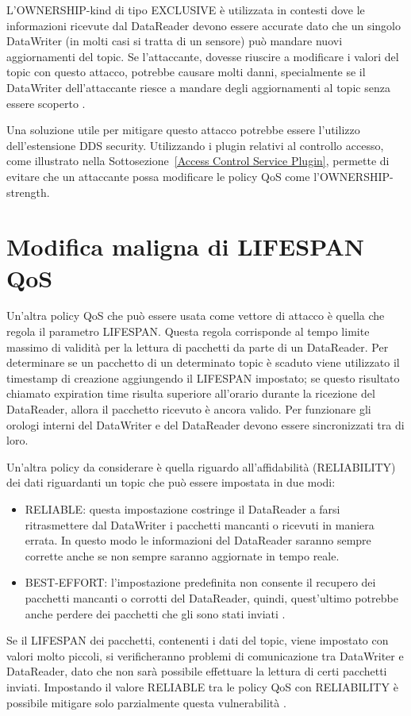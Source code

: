 L'OWNERSHIP-kind di tipo EXCLUSIVE è utilizzata in contesti dove le
informazioni ricevute dal DataReader devono essere accurate dato che un singolo
DataWriter (in molti casi si tratta di un sensore) può mandare nuovi aggiornamenti
del topic. Se l'attaccante, dovesse riuscire a modificare i valori del topic con
questo attacco, potrebbe causare molti danni,
specialmente se il DataWriter dell'attaccante riesce a mandare degli aggiornamenti
al topic senza essere scoperto
\cite{DBLP:conf/malware/MichaudDL18}.

Una soluzione utile per mitigare questo attacco potrebbe essere l'utilizzo
dell'estensione DDS security. Utilizzando i plugin relativi al controllo accesso,
come illustrato nella Sottosezione~\ref{Access Control Service Plugin}, permette
di evitare che un attaccante possa modificare le policy QoS come 
l'OWNERSHIP-strength.


\section{Modifica maligna di LIFESPAN QoS}

Un'altra policy QoS che può essere usata come vettore di attacco è quella
che regola il parametro LIFESPAN. Questa regola corrisponde al tempo limite massimo 
di validità per la
lettura di pacchetti da parte di un DataReader. Per determinare se un pacchetto
di un determinato topic è scaduto viene utilizzato il timestamp di creazione
aggiungendo il LIFESPAN impostato; se questo risultato chiamato 
expiration time risulta
superiore all'orario durante la ricezione del DataReader, allora il pacchetto
ricevuto è ancora valido. 
Per funzionare gli orologi interni del DataWriter e del DataReader
devono essere sincronizzati tra di loro.

Un'altra policy da considerare è quella riguardo all'affidabilità
(RELIABILITY) dei dati riguardanti un topic che può essere impostata in due
modi:
\begin{itemize}
    \item RELIABLE: questa impostazione costringe il DataReader a farsi
    ritrasmettere dal DataWriter i pacchetti mancanti o ricevuti in maniera errata.
    In questo modo le informazioni del DataReader saranno sempre corrette anche
    se non sempre saranno aggiornate in tempo reale.
    \item BEST-EFFORT: l'impostazione predefinita non consente il recupero
    dei pacchetti mancanti o corrotti
    del DataReader, quindi, quest'ultimo potrebbe anche perdere dei pacchetti 
    che gli sono stati inviati \cite{dds1.4}.
\end{itemize}
Se il LIFESPAN dei pacchetti, contenenti i dati del topic,
viene impostato con valori molto piccoli, si verificheranno problemi di comunicazione
tra DataWriter e DataReader, dato che non sarà possibile effettuare la lettura di 
certi pacchetti inviati. Impostando il valore RELIABLE tra le policy QoS con
RELIABILITY è possibile mitigare 
solo parzialmente questa vulnerabilità
\cite{DBLP:conf/malware/MichaudDL18}.

